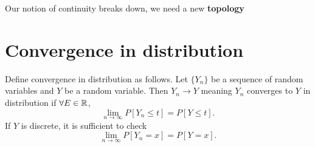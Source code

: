 \documentclass[a4paper]{article}
\begin{document}
\begin{remark}
  Our notion of continuity breaks down, we need a new \textbf{topology}
\end{remark}

\section{Convergence in distribution}
\begin{definition}
  Define convergence in distribution as follows. Let $\{Y_n\} $ be a sequence of random variables and $Y$ be a random variable. Then  $Y_n \to Y$ meaning  $Y_n$ converges to  $Y$ in distribution if $\forall E \in \mathbb{R}$,
  \[
    \lim_{n \to \infty} P[Y_n \leq t] = P[Y \leq t] 
  .\] 
  If $Y$ is  discrete, it is sufficient to check
  \[
    \lim_{n \to \infty} P[Y_n = x] = P[Y=x] 
  .\] 
\end{definition}
\end{document}
